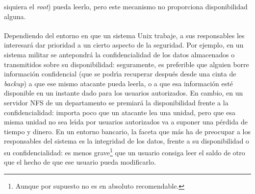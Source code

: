 siquiera el {\it root}) pueda leerlo, pero este mecanismo no proporciona 
disponibilidad alguna.\\
\\Dependiendo del entorno en que un sistema Unix trabaje, a sus responsables
les interesar\'a dar prioridad a un cierto aspecto de la seguridad. Por ejemplo,
en un sistema militar se antepondr\'a la confidencialidad de los datos 
almacenados o
transmitidos sobre su disponibilidad: seguramente, es preferible que alguien
borre informaci\'on confidencial (que se podr\'{\i}a recuperar despu\'es desde
una cinta de {\it backup}) a que ese mismo atacante pueda leerla, o a que esa
informaci\'on est\'e disponible en un instante dado para los usuarios 
autorizados. En cambio, en un servidor NFS de un departamento se premiar\'a la
disponibilidad frente a la confidencialidad: importa poco que un atacante lea
una unidad, pero que esa misma unidad no sea le\'{\i}da por usuarios 
autorizados va a suponer una p\'erdida de tiempo y dinero. En un entorno 
bancario, la faceta que m\'as ha de preocupar a los responsables del sistema
es la integridad de los datos, frente a su disponibilidad o su confidencialidad:
es menos grave\footnote{Aunque por supuesto no es en absoluto recomendable.} 
que un usuario consiga leer el saldo de otro que el hecho de que ese usuario 
pueda modificarlo.
